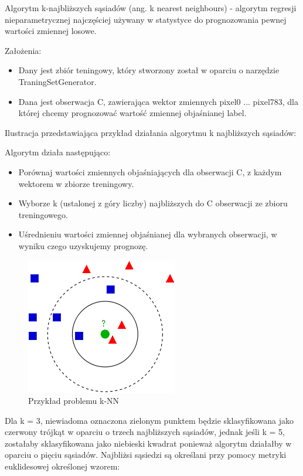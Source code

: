 \documentclass[brudnopis]{xmgr}
\begin{document}
Algorytm k-najbliższych sąsiadów (ang. k nearest neighbours) - algorytm regresji nieparametrycznej najczęściej używany w statystyce do prognozowania pewnej wartości zmiennej losowe.

Założenia:
\begin{itemize}
\item
Dany jest zbiór teningowy, który stworzony został w oparciu o narzędzie TraningSetGenerator.
\item
Dana jest obserwacja C, zawierająca wektor zmiennych pixel0 ... pixel783, dla której chcemy prognozować wartość zmiennej objaśnianej label.
\end{itemize}	

   Ilustracja przedstawiająca przykład działania algorytmu k najbliższych sąsiadów:

Algorytm działa następująco:
\begin{itemize}
\item
Porównaj wartości zmiennych objaśniających dla obserwacji C, z każdym wektorem w zbiorze treningowy.
\item
Wyborze k (ustalonej z góry liczby) najbliższych do C obserwacji ze zbioru treningowego.
\item
Uśrednieniu wartości zmiennej objaśnianej dla wybranych obserwacji, w wyniku czego uzyskujemy prognozę.	
\end{itemize}	
     
\begin{figure}[!tbh]
\centering
\includegraphics[width=.6\hsize]{fig/knn}
\caption{Przykład problemu k-NN}
\end{figure}
\newpage
Dla k = 3, niewiadoma oznaczona zielonym punktem będzie sklasyfikowana jako czerwony trójkąt w oparciu o trzech najbliższych sąsiadów, jednak jeśli k = 5, zostałaby sklasyfikowana jako niebieski kwadrat ponieważ algorytm działałby w oparciu o pięciu sąsiadów. Najbliżsi sąsiedzi są określani przy pomocy metryki euklidesowej określonej wzorem:
\end{document}
